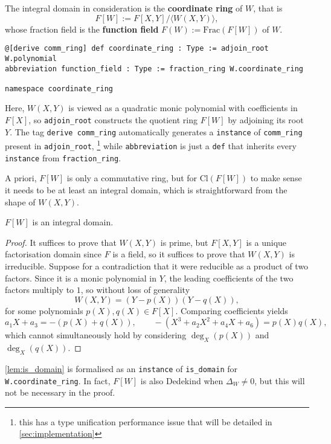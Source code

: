 \documentclass[a4paper,UKenglish,cleveref,autoref,thm-restate]{lipics-v2021}
\begin{document}
The integral domain in consideration is the \textbf{coordinate ring} of $ W $, that is
\[ F[W] := F[X, Y] / \langle W(X, Y) \rangle, \]
whose fraction field is the \textbf{function field} $ F(W) := \mathrm{Frac}(F[W]) $ of $ W $.
\begin{lstlisting}
@[derive comm_ring] def coordinate_ring : Type := adjoin_root W.polynomial
abbreviation function_field : Type := fraction_ring W.coordinate_ring

namespace coordinate_ring
\end{lstlisting}
Here, $ W(X, Y) $ is viewed as a quadratic monic polynomial with coefficients in $ F[X] $, so \texttt{adjoin\_root} constructs the quotient ring $ F[W] $ by adjoining its root $ Y $. The tag \texttt{derive comm\_ring} automatically generates a \texttt{instance} of \texttt{comm\_ring} present in \texttt{adjoin\_root}, \footnote{this has a type unification performance issue that will be detailed in \cref{sec:implementation}} while \texttt{abbreviation} is just a \texttt{def} that inherits every \texttt{instance} from \texttt{fraction\_ring}.

A priori, $ F[W] $ is only a commutative ring, but for $ \mathrm{Cl}(F[W]) $ to make sense it needs to be at least an integral domain, which is straightforward from the shape of $ W(X, Y) $.

\begin{lemma}
\label{lem:is_domain}
$ F[W] $ is an integral domain.
\end{lemma}

\begin{proof}
It suffices to prove that $ W(X, Y) $ is prime, but $ F[X, Y] $ is a unique factorisation domain since $ F $ is a field, so it suffices to prove that $ W(X, Y) $ is irreducible. Suppose for a contradiction that it were reducible as a product of two factors. Since it is a monic polynomial in $ Y $, the leading coefficients of the two factors multiply to $ 1 $, so without loss of generality
\[ W(X, Y) = (Y - p(X))(Y - q(X)), \]
for some polynomials $ p(X), q(X) \in F[X] $. Comparing coefficients yields
\[ a_1X + a_3 = -(p(X) + q(X)), \qquad -(X^3 + a_2X^2 + a_4X + a_6) = p(X)q(X), \]
which cannot simultaneously hold by considering $ \deg_X(p(X)) $ and $ \deg_X(q(X)) $.
\end{proof}

\cref{lem:is_domain} is formalised as an \texttt{instance} of \texttt{is\_domain} for \texttt{W.coordinate\_ring}. In fact, $ F[W] $ is also Dedekind when $ \Delta_W \ne 0 $, but this will not be necessary in the proof.
\end{document}
